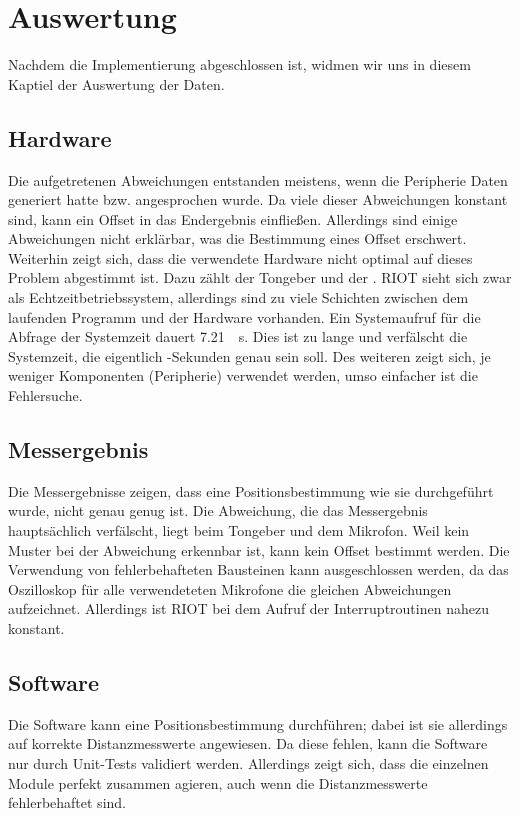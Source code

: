 \newpage
\section{Auswertung}

Nachdem die Implementierung abgeschlossen ist, widmen wir uns in diesem Kaptiel der Auswertung der Daten.

\subsection{Hardware}
Die aufgetretenen Abweichungen entstanden meistens, wenn die Peripherie Daten generiert hatte bzw. angesprochen wurde. Da viele dieser Abweichungen konstant sind, kann ein Offset in das Endergebnis einfließen. Allerdings sind einige Abweichungen nicht erklärbar, was die Bestimmung eines Offset erschwert. Weiterhin zeigt sich, dass die verwendete Hardware nicht optimal auf dieses Problem abgestimmt ist. Dazu zählt der Tongeber und der \microphone . RIOT sieht sich zwar als Echtzeitbetriebssystem, allerdings sind zu viele Schichten zwischen dem laufenden Programm und der Hardware vorhanden. Ein Systemaufruf für die Abfrage der Systemzeit dauert \SI{7,21}{\mu s}. Dies ist zu lange und verfälscht die Systemzeit, die eigentlich \si{\mu}-Sekunden genau sein soll. Des weiteren zeigt sich, je weniger Komponenten (Peripherie) verwendet werden, umso einfacher ist die Fehlersuche.

\subsection{Messergebnis}
Die Messergebnisse zeigen, dass eine Positionsbestimmung wie sie durchgeführt wurde, nicht genau genug ist. Die Abweichung, die das Messergebnis hauptsächlich verfälscht, liegt beim Tongeber und dem Mikrofon. Weil kein Muster bei der Abweichung erkennbar ist, kann kein Offset bestimmt werden. Die Verwendung von fehlerbehafteten Bausteinen kann ausgeschlossen werden, da das Oszilloskop für alle verwendeteten Mikrofone die gleichen Abweichungen aufzeichnet. Allerdings ist RIOT bei dem Aufruf der Interruptroutinen nahezu konstant. 

\subsection{Software}
Die Software kann eine Positionsbestimmung durchführen; dabei ist sie allerdings auf korrekte Distanzmesswerte angewiesen. Da diese fehlen, kann die Software nur durch Unit-Tests validiert werden. Allerdings zeigt sich, dass die einzelnen Module perfekt zusammen agieren, auch wenn die Distanzmesswerte fehlerbehaftet sind.

